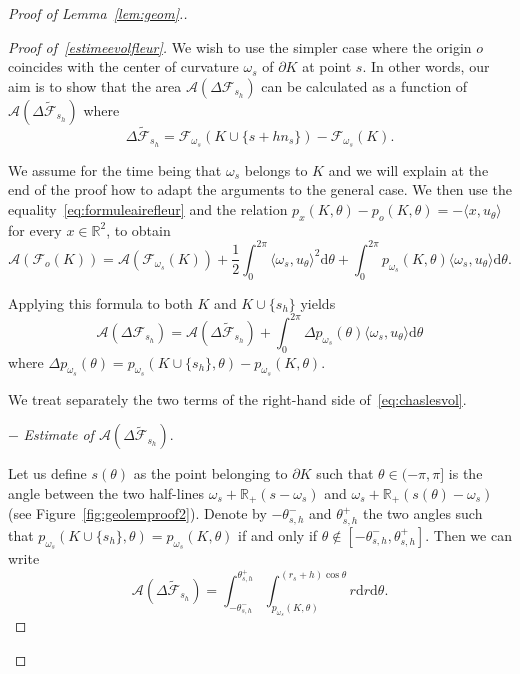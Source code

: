 \documentclass[10pt]{amsart}
\theoremstyle{definition}\newtheorem{defi}[theo]{Definition}\newtheorem{rema}[theo]{Remark}\newtheorem{exam}[theo]{Example}\newtheorem{exem}[theo]{Example}\newtheorem{nota}[theo]{Notation}
\newcommand{\cA}{\mathcal{A}}
\newcommand{\cF}{\mathcal{F}}
\newcommand{\dd}{\mathrm{d}}
\newcommand{\R}{\mathbb{R}}
\newcommand{\pass}{\vspace{0.3cm}\noindent}
\newcommand{\noi}{\noindent}
\newenvironment*{prooff}{\begin{proof}}{\let\qed\relax\end{proof}}
\begin{document}
\begin{proof}[{Proof of Lemma~\ref{lem:geom}.}]
\begin{prooff}[{Proof of~\eqref{estimeevolfleur}}]
We wish to use the simpler case where the origin $o$ coincides with the center of curvature $\omega_s$ of $\partial K$ at point $s$. In other words, our aim is to show that the area $\cA(\Delta\cF_{s_h})$ can be calculated as a function of $\cA(\Delta\widetilde{\cF}_{s_h})$ where
\[
\Delta\widetilde{\cF}_{s_h}=\cF_{\omega_s}(K \cup \{s+h n_s\})-\cF_{\omega_s}(K).
\]

We assume for the time being that $\omega_s$ belongs to $K$ and we will explain at the end of the proof how to adapt the arguments to the general case. We then use the equality~\eqref{eq:formuleairefleur} and the relation $p_x(K,\theta) -p_o(K,\theta) = -\langle x, u_{\theta}\rangle$ for every $x\in\R^2$, to obtain
\begin{equation}\label{eq:eqsuppl}
\cA(\cF_o(K)) =
\cA(\cF_{\omega_s}(K)) +\frac1{2}\int_0^{2\pi}\langle \omega_s, u_{\theta}\rangle^2\dd \theta+\int_0^{2\pi}p_{\omega_s}(K,\theta)\langle \omega_s, u_{\theta}\rangle\dd \theta.
\end{equation}

Applying this formula to both $K$ and $K\cup\{s_h\}$ yields
\begin{equation}\label{eq:chaslesvol}
\cA(\Delta\cF_{s_h})=\cA(\Delta\widetilde{\cF}_{s_h}) + \int_0^{2\pi} \Delta p_{\omega_s}(\theta)\langle \omega_s, u_{\theta}\rangle\dd\theta
\end{equation}
where $\Delta p_{\omega_s}(\theta)=p_{\omega_s}(K \cup \{s_h\},\theta)-p_{\omega_s}(K, \theta)$.

 We treat separately the two terms of the right-hand side of~\eqref{eq:chaslesvol}.

$-$ \emph{Estimate of $\cA(\Delta\widetilde{\cF}_{s_h})$}.

Let us define $s(\theta)$ as the point belonging to $\partial K$ such that $\theta \in(-\pi,\pi]$ is the angle between the two half-lines $\omega_s+\R_+(s-\omega_s)$ and $\omega_s+\R_+(s(\theta)-\omega_s)$ (see Figure~\ref{fig:geolemproof2}). Denote by $-\theta_{s,h}^-$ and $\theta_{s,h}^+$ the two angles such that $p_{\omega_s}(K\cup\{s_h\},\theta) = p_{\omega_s}(K,\theta)$ if and only if $\theta\notin[-\theta_{s,h}^-,\theta_{s,h}^+]$. Then we can write
\begin{equation}\label{eq:voldifflow1}
\cA(\Delta\widetilde{\cF}_{s_h})= \int_{-\theta_{s,h}^-}^{\theta_{s,h}^+}\int_{p_{\omega_s}(K,\theta)}^{(r_s+h)\cos\theta} r \dd r \dd\theta.
\end{equation}


\end{prooff}
\end{proof}
\end{document}
